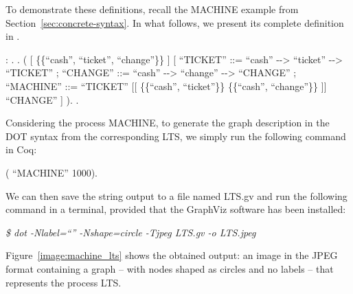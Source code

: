 To demonstrate these definitions, recall the MACHINE example from Section~\ref{sec:concrete-syntax}. In what follows, we present its complete definition in \CSPcoq{}.

\begin{coqdoccode}
	\coqdocnoindent
	  : .\coqdoceol
	\coqdocnoindent
	.\coqdoceol
	\coqdocindent{1.00em}
	 (\coqdoceol
	\coqdocindent{2.00em}
	\coqdoceol
	\coqdocindent{2.00em}
	[  \{\{``cash'', ``ticket'', ``change''\}\} ]\coqdoceol
	\coqdocindent{2.00em}
	[ ``TICKET'' ::= ``cash'' -{}-> ``ticket'' -{}->  ``TICKET''\coqdoceol
	\coqdocindent{2.00em}
	; ``CHANGE'' ::= ``cash'' -{}-> ``change'' -{}->  ``CHANGE''\coqdoceol
	\coqdocindent{2.00em}
	; ``MACHINE'' ::=  ``TICKET''\coqdoceol
	\coqdocindent{10.50em}[[ \{\{``cash'', ``ticket''\}\}  \{\{``cash'', ``change''\}\} ]]\coqdoceol
	\coqdocindent{10.50em} ``CHANGE'' ]\coqdoceol
	\coqdocindent{1.00em}
	).\coqdoceol
	\coqdocnoindent
	.\coqdoceol
\end{coqdoccode}

Considering the process MACHINE, to generate the graph description in the DOT syntax from the corresponding LTS, we simply run the following command in Coq:

\begin{coqdoccode}
	\coqdocnoindent
	  (  ``MACHINE'' 1000).\coqdoceol
\end{coqdoccode}

We can then save the string output to a file named LTS.gv and run the following command in a terminal, provided that the GraphViz software has been installed:

\noindent \emph{\$ dot -Nlabel=``'' -Nshape=circle -Tjpeg LTS.gv -o LTS.jpeg}

Figure~\ref{image:machine_lts} shows the obtained output: an image in the JPEG format containing a graph -- with nodes shaped as circles and no labels -- that represents the process LTS.

